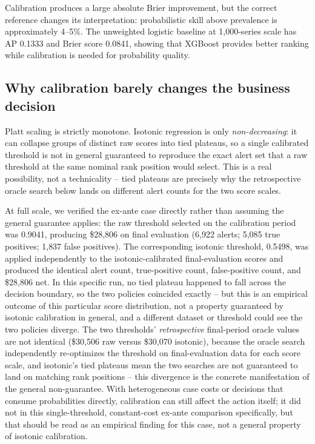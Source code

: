 \documentclass[11pt]{article}
\begin{document}
Calibration produces a large absolute Brier improvement, but the correct reference changes its interpretation: probabilistic skill above prevalence is approximately 4--5\%. The unweighted logistic baseline at 1{,}000-series scale has AP 0.1333 and Brier score 0.0841, showing that XGBoost provides better ranking while calibration is needed for probability quality.

\subsection{Why calibration barely changes the business decision}

Platt scaling is strictly monotone. Isotonic regression is only \emph{non-decreasing}: it can collapse groups of distinct raw scores into tied plateaus, so a single calibrated threshold is not in general guaranteed to reproduce the exact alert set that a raw threshold at the same nominal rank position would select. This is a real possibility, not a technicality -- tied plateaus are precisely why the retrospective oracle search below lands on different alert counts for the two score scales.

At full scale, we verified the ex-ante case directly rather than assuming the general guarantee applies: the raw threshold selected on the calibration period was 0.9041, producing \$28{,}806 on final evaluation (6{,}922 alerts; 5{,}085 true positives; 1{,}837 false positives). The corresponding isotonic threshold, 0.5498, was applied independently to the isotonic-calibrated final-evaluation scores and produced the identical alert count, true-positive count, false-positive count, and \$28{,}806 net. In this specific run, no tied plateau happened to fall across the decision boundary, so the two policies coincided exactly -- but this is an empirical outcome of this particular score distribution, not a property guaranteed by isotonic calibration in general, and a different dataset or threshold could see the two policies diverge. The two thresholds' \emph{retrospective} final-period oracle values are not identical (\$30{,}506 raw versus \$30{,}070 isotonic), because the oracle search independently re-optimizes the threshold on final-evaluation data for each score scale, and isotonic's tied plateaus mean the two searches are not guaranteed to land on matching rank positions -- this divergence is the concrete manifestation of the general non-guarantee. With heterogeneous case costs or decisions that consume probabilities directly, calibration can still affect the action itself; it did not in this single-threshold, constant-cost ex-ante comparison specifically, but that should be read as an empirical finding for this case, not a general property of isotonic calibration.
\end{document}
